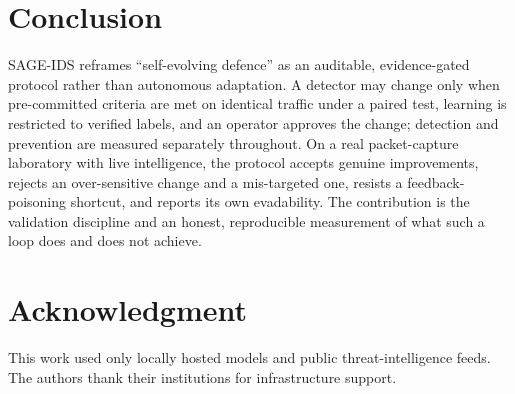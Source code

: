 \documentclass[journal]{IEEEtran}
\newcommand{\sage}{SAGE-IDS}
\begin{document}
\section{Conclusion}
\sage{} reframes ``self-evolving defence'' as an auditable, evidence-gated protocol rather than
autonomous adaptation. A detector may change only when pre-committed criteria are met on identical
traffic under a paired test, learning is restricted to verified labels, and an operator approves the
change; detection and prevention are measured separately throughout. On a real packet-capture
laboratory with live intelligence, the protocol accepts genuine improvements, rejects an
over-sensitive change and a mis-targeted one, resists a feedback-poisoning shortcut, and reports its
own evadability. The contribution is the validation discipline and an honest, reproducible measurement
of what such a loop does and does not achieve.

\section*{Acknowledgment}
This work used only locally hosted models and public threat-intelligence feeds. The authors thank
their institutions for infrastructure support.



\end{document}
